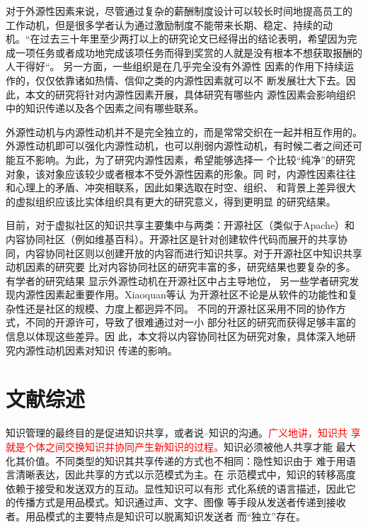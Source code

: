 \documentclass[12pt,a4paper]{ctexart}
\begin{document}
对于外源性因素来说，尽管通过复杂的薪酬制度设计可以较长时间地提高员工的
工作动机，但是很多学者认为通过激励制度不能带来长期、稳定、持续的动机。“在过去三十年里至少两打以上的研究论文已经得出的结论表明，希望因为完成一项任务或者成功地完成该项任务而得到奖赏的人就是没有根本不想获取报酬的人干得好“\cite{93120316461993}。
另一方面，一些组织是在几乎完全没有外源性
因素的作用下持续运作的，仅仅依靠诸如热情、信仰之类的内源性因素就可以不
断发展壮大下去。因此，本文的研究将针对内源性因素开展，具体研究有哪些内
源性因素会影响组织中的知识传递以及各个因素之间有哪些联系。

外源性动机与内源性动机并不是完全独立的，而是常常交织在一起并相互作用的。
外源性动机即可以强化内源性动机，也可以削弱内源性动机，有时候二者之间还可
能互不影响\cite{deci1971eem}。为此，为了研究内源性因素，希望能够选择一
个比较“纯净”的研究对象，该对象应该较少或者根本不受外源性因素的形象。同
时，内源性因素往往和心理上的矛盾、冲突相联系，因此如果选取在时空、组织、
和背景上差异很大的虚拟组织应该比实体组织具有更大的研究意义，得到更明显
的研究结果。

目前，对于虚拟社区的知识共享主要集中与两类：开源社区（类似于Apache）和
内容协同社区（例如维基百科）。开源社区是针对创建软件代码而展开的共享协
同，内容协同社区则以创建开放的内容而进行知识共享。对于开源社区中知识共享动机因素的研究要
比对内容协同社区的研究丰富的多，研究结果也要复杂的多。有学者的研究结果
显示外源性动机在开源社区中占主导地位\cite{10.1109/HICSS.2001.927045}，
另一些学者研究发现内源性因素起重要作用\cite{Lakhani2003}。Xiaoquan等认
为开源社区不论是从软件的功能性和复杂性还是社区的规模、力度上都迥异不同。
不同的开源社区采用不同的协作方式，不同的开源许可，导致了很难通过对一小
部分社区的研究而获得足够丰富的信息以体现这些差异\cite{Zhang2006}。因
此，本文将以内容协同社区为研究对象，具体深入地研究内源性动机因素对知识
传递的影响。


\section{文献综述}

知识管理的最终目的是促进知识共享，或者说--知识的沟通。\textcolor{red}{广义地讲，知识共
享就是个体之间交换知识并协同产生新知识的过程。}知识必须被他人共享才能
最大化其价值。不同类型的知识其共享传递的方式也不相同：隐性知识由于
难于用语言清晰表达，因此共享的方式以示范模式为主。在
示范模式中，知识的转移高度依赖于接受和发送双方的互动。\cite{zhoubo2006}显性知识可以有形
式化系统的语言描述，因此它的传播方式是用品模式。知识通过声、文字、图像
等手段从发送者传递到接收者。用品模式的主要特点是知识可以脱离知识发送者
而“独立”存在\cite{zhoubo2006}。
\end{document}
